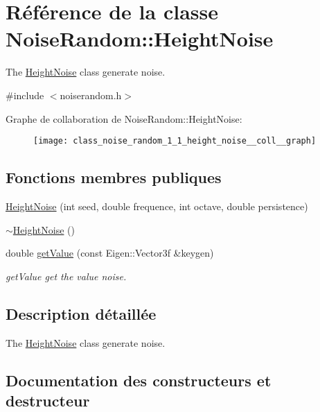\hypertarget{class_noise_random_1_1_height_noise}{}\section{Référence de la classe Noise\+Random\+:\+:Height\+Noise}
\label{class_noise_random_1_1_height_noise}


The \hyperlink{class_noise_random_1_1_height_noise}{Height\+Noise} class generate noise.  




{\ttfamily \#include $<$noiserandom.\+h$>$}



Graphe de collaboration de Noise\+Random\+:\+:Height\+Noise\+:
\nopagebreak
\begin{figure}[H]
\begin{center}
\leavevmode
\texttt{[image: class\_noise\_random\_1\_1\_height\_noise\_\_coll\_\_graph]}
\end{center}
\end{figure}
\subsection*{Fonctions membres publiques}
\begin{DoxyCompactItemize}
\item 
\hyperlink{class_noise_random_1_1_height_noise_ab166c1a0af9e801a289d33a6d7bd2292}{Height\+Noise} (int seed, double frequence, int octave, double persistence)
\item 
\hyperlink{class_noise_random_1_1_height_noise_a85d91613d7cc310e928f136680afff22}{$\sim$\+Height\+Noise} ()
\item 
double \hyperlink{class_noise_random_1_1_height_noise_a0be08d8bcaef1c76a80c45898355d236}{get\+Value} (const Eigen\+::\+Vector3f \&keygen)
\begin{DoxyCompactList}\small\item\em get\+Value get the value noise. \end{DoxyCompactList}\end{DoxyCompactItemize}


\subsection{Description détaillée}
The \hyperlink{class_noise_random_1_1_height_noise}{Height\+Noise} class generate noise. 

\subsection{Documentation des constructeurs et destructeur}
\mbox{\label{class_noise_random_1_1_height_noise_ab166c1a0af9e801a289d33a6d7bd2292}} 
